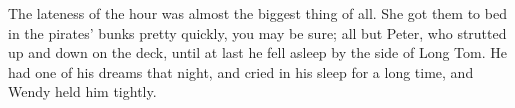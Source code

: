 The lateness of the hour was almost the biggest thing of all.
She got them to bed in the pirates' bunks pretty quickly, you may be sure;
all but Peter, who strutted up and down on the deck,
until at last he fell asleep by the side of Long Tom.
He had one of his dreams that night,
and cried in his sleep for a long time, and Wendy held him tightly.

\endinput
